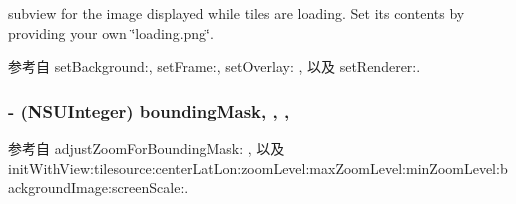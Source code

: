 subview for the image displayed while tiles are loading. Set its contents by providing your own \char`\"{}loading.\-png\char`\"{}. 



参考自 set\-Background\-:, set\-Frame\-:, set\-Overlay\-: , 以及 set\-Renderer\-:.

\hypertarget{interface_r_m_map_contents_a1ab8589d1d1fc05208eaffefcff9edaf}{
\subsubsection[{bounding\-Mask}]{\setlength{\rightskip}{0pt plus 5cm}-\/ (N\-S\-U\-Integer) bounding\-Mask\hspace{0.3cm}{\ttfamily [read]}, {\ttfamily [write]}, {\ttfamily [atomic]}, {\ttfamily [assign]}}}\label{interface_r_m_map_contents_a1ab8589d1d1fc05208eaffefcff9edaf}


参考自 adjust\-Zoom\-For\-Bounding\-Mask\-: , 以及 init\-With\-View\-:tilesource\-:center\-Lat\-Lon\-:zoom\-Level\-:max\-Zoom\-Level\-:min\-Zoom\-Level\-:background\-Image\-:screen\-Scale\-:.

